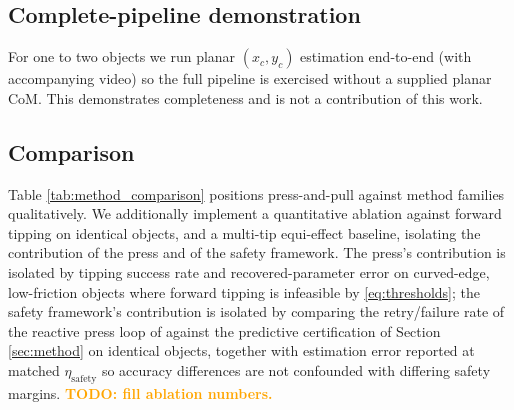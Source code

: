 \documentclass[10pt, conference]{IEEEtran}
\newcommand{\todo}[1]{\textcolor{orange}{\textbf{TODO: #1}}}
\begin{document}
\subsection{Complete-pipeline demonstration} 
For one to two objects we run planar $(x_c, y_c)$ estimation end-to-end (with accompanying video) so the full pipeline is exercised without a supplied planar CoM. This demonstrates completeness and is not a contribution of this work.

\subsection{Comparison}
Table \ref{tab:method_comparison} positions press-and-pull against method families qualitatively. We additionally implement a quantitative ablation against forward tipping on identical objects, and a multi-tip equi-effect baseline, isolating the contribution of the press and of the safety framework. The press's contribution is isolated by tipping success rate and recovered-parameter error on curved-edge, low-friction objects where forward tipping is infeasible by \eqref{eq:thresholds}; the safety framework's contribution is isolated by comparing the retry/failure rate of the reactive press loop of \cite{hyland_isrr} against the predictive certification of Section \ref{sec:method} on identical objects, together with estimation error reported at matched $\eta_{\mathrm{safety}}$ so accuracy differences are not confounded with differing safety margins. \todo{fill ablation numbers.}
\end{document}
